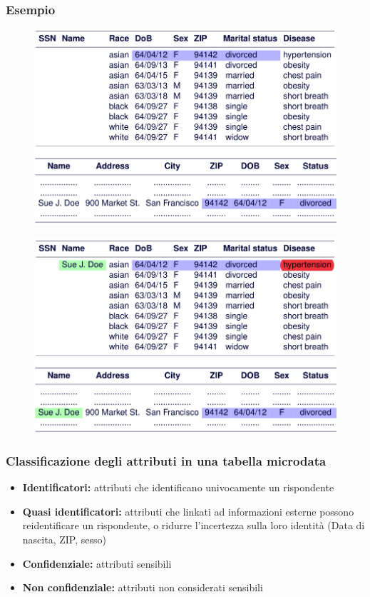 \documentclass{report}
\begin{document}
\subsubsection{Esempio}
\begin{figure}[ht]
    \centering
    \includegraphics[width=0.9\linewidth]{images/anon-1.png}
\end{figure}
\begin{figure}[ht]
    \centering
    \includegraphics[width=0.9\linewidth]{images/anon-2.png}
\end{figure}

\subsubsection{Classificazione degli attributi in una tabella microdata}

\begin{itemize}
    \item \textbf{Identificatori:} attributi che identificano univocamente un rispondente
    \item \textbf{Quasi identificatori:} attributi che linkati ad informazioni esterne possono reidentificare un rispondente, o ridurre 
    l'incertezza sulla loro identità (Data di nascita, ZIP, sesso)
    \item \textbf{Confidenziale:} attributi sensibili
    \item \textbf{Non confidenziale:} attributi non considerati sensibili
\end{itemize}
\end{document}
